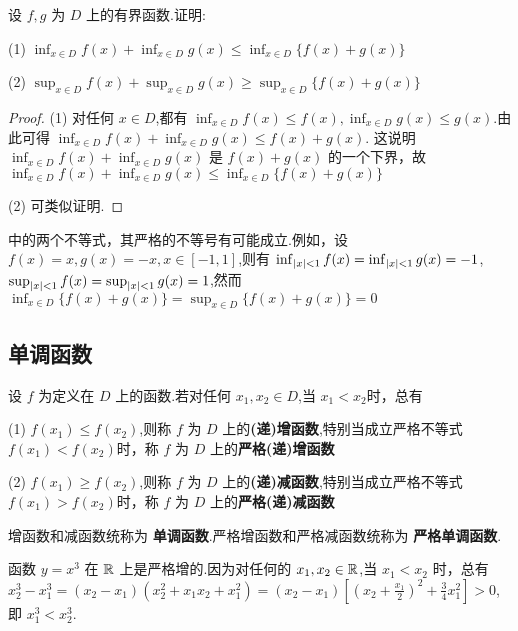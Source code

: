 \begin{example}\label{ex:supfx}
    设 $f,g$ 为 $D$ 上的有界函数.证明:

    (1) $\inf_{x\in D} f(x)+\inf_{x\in D} g(x)\le \inf_{x\in D} \{f(x)+g(x)\}$

    (2) $\sup_{x\in D} f(x)+\sup_{x\in D} g(x)\ge \sup_{x\in D} \{f(x)+g(x)\}$
\end{example}

\begin{proof}
    (1) 对任何 $x\in D$,都有 $\inf_{x\in D} f(x)\le f(x),\inf_{x\in D} g(x)\le g(x)$.由此可得 $\inf_{x\in D} f(x)+\inf_{x\in D} g(x)\le f(x)+g(x)$. 这说明 $\inf_{x\in D} f(x)+\inf_{x\in D} g(x)$ 是 $f(x)+g(x)$ 的一个下界，故 $\inf_{x\in D} f(x)+\inf_{x\in D} g(x)\le \inf_{x\in D} \{f(x)+g(x)\}$

    (2) 可类似证明.
\end{proof}

\begin{annotation}
     中的两个不等式，其严格的不等号有可能成立.例如，设 $f(x)=x,g(x)=-x,x\in [-1,1]$,则有 $\inf_{\mid x \mid<1} f(x)=\inf_{\mid x \mid<1} g(x)=-1$,$\sup_{\mid x \mid<1} f(x)=\sup_{\mid x \mid<1} g(x)=1$,然而 $\inf_{x\in D} \{f(x)+g(x)\}=\sup_{x\in D} \{f(x)+g(x)\}=0$
\end{annotation}

\subsection{单调函数}

\begin{definition}[单调函数]
    设 $f$ 为定义在 $D$ 上的函数.若对任何 $x_1,x_2\in D$,当 $x_1<x_2$时，总有

    (1) $f(x_1)\le f(x_2)$,则称 $f$ 为 $D$ 上的\textbf{(递)增函数},特别当成立严格不等式 $f(x_1)<f(x_2)$时，称 $f$ 为 $D$ 上的\textbf{严格(递)增函数}

    (2) $f(x_1)\ge f(x_2)$,则称 $f$ 为 $D$ 上的\textbf{(递)减函数},特别当成立严格不等式 $f(x_1)>f(x_2)$时，称 $f$ 为 $D$ 上的\textbf{严格(递)减函数}

    增函数和减函数统称为 \textbf{单调函数}.严格增函数和严格减函数统称为 \textbf{严格单调函数}.
\end{definition}

\begin{example}
    函数 $y=x^3$ 在 $\mathbb{R}$ 上是严格增的.因为对任何的 $x_1,x_2\in \mathbb{R}$,当 $x_1<x_2$ 时，总有 $x_2^3-x_1^3=(x_2-x_1)(x_2^2+x_1x_2+x_1^2)=(x_2-x_1)[(x_2+\frac{x_1}{2})^2+\frac{3}{4}x_1^2]>0$,即 $x_1^3<x_2^3$.
\end{example}

